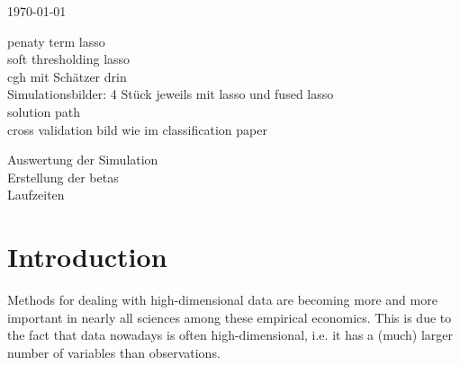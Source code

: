 \documentclass{article}
\theoremstyle{definition}
\begin{document}
\begin{titlepage}
	
	
	\vfill\vfill\vfill %
	
	{\large\today} %
	
	
	 
	
	\vfill %
	
\end{titlepage} \newpage


\tableofcontents \newpage


\listoffigures
penaty term lasso \\
soft thresholding lasso \\
cgh mit Schätzer drin \\
Simulationsbilder: 4 Stück jeweils mit lasso und fused lasso \\
solution path \\
cross validation bild wie im classification paper


\listoftables 
Auswertung der Simulation \\
Erstellung der betas \\
Laufzeiten
\newpage 



\section{Introduction}
Methods for dealing with high-dimensional data are becoming more and more important in nearly all sciences among these empirical economics. This is due to the fact that data nowadays is often high-dimensional, i.e. it has a (much) larger number of variables than observations.
\end{document}
